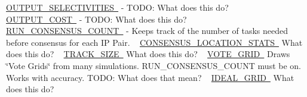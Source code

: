  \mbox{\hyperlink{}{O\+U\+T\+P\+U\+T\+\_\+\+S\+E\+L\+E\+C\+T\+I\+V\+I\+T\+I\+ES }} -\/ T\+O\+DO\+: What does this do? ~\newline
 \mbox{\hyperlink{}{O\+U\+T\+P\+U\+T\+\_\+\+C\+O\+ST }} -\/ T\+O\+DO\+: What does this do? ~\newline
 \mbox{\hyperlink{}{R\+U\+N\+\_\+\+C\+O\+N\+S\+E\+N\+S\+U\+S\+\_\+\+C\+O\+U\+NT }} -\/ Keeps track of the number of tasks needed before consensus for each IP Pair. ~\newline
 \mbox{\hyperlink{}{C\+O\+N\+S\+E\+N\+S\+U\+S\+\_\+\+L\+O\+C\+A\+T\+I\+O\+N\+\_\+\+S\+T\+A\+TS }} What does this do? ~\newline
 \mbox{\hyperlink{}{T\+R\+A\+C\+K\+\_\+\+S\+I\+ZE }} What does this do? ~\newline
 \mbox{\hyperlink{}{V\+O\+T\+E\+\_\+\+G\+R\+ID }} Draws \char`\"{}\+Vote Grids\char`\"{} from many simulations. R\+U\+N\+\_\+\+C\+O\+N\+S\+E\+N\+S\+U\+S\+\_\+\+C\+O\+U\+NT must be on. Works with accuracy. T\+O\+DO\+: What does that mean? ~\newline
 \mbox{\hyperlink{}{I\+D\+E\+A\+L\+\_\+\+G\+R\+ID }} What does this do? ~\newline
